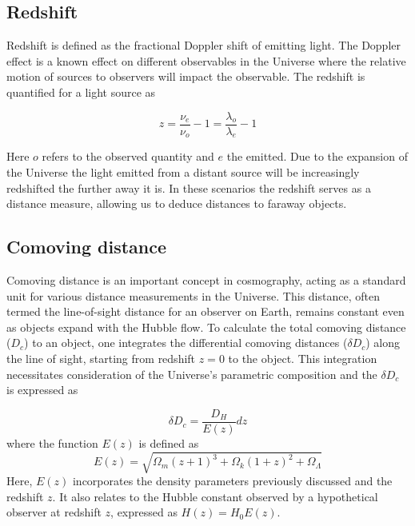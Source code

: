 \documentclass{article}
\begin{document}
\subsection{Redshift}
Redshift is defined as the fractional Doppler shift of emitting light. The Doppler effect is a known effect on different observables in the Universe where the relative motion of sources to observers will impact the observable. The redshift is quantified for a light source as 

\begin{equation}
    z = \frac{\nu_e}{\nu_o}-1 = \frac{\lambda_o}{\lambda_e}-1
\end{equation}

Here $o$ refers to the observed quantity and $e$ the emitted. Due to the expansion of the Universe the light emitted from a distant source will be increasingly redshifted the further away it is.
In these scenarios the redshift serves as a distance measure, allowing us to deduce distances to faraway objects.



\subsection{Comoving distance}
\label{sec:comoving_distance}


Comoving distance is an important concept in cosmography, 
acting as a standard unit for various distance measurements in the Universe. 
This distance, often termed the line-of-sight distance for an observer on Earth, 
remains constant even as objects expand with the Hubble flow. 
To calculate the total comoving distance ($D_c$) to an object, 
one integrates the differential comoving distances ($\delta D_c$) along the line of sight, starting from redshift 
$z=0$ to the object. This integration necessitates consideration of the Universe's parametric composition and the $\delta D_c$ is expressed as

\begin{equation}
    \delta D_c = \frac{D_H}{E(z)}dz
\end{equation}
where the function $E(z)$ is defined as
\begin{equation}
    E(z)  = \sqrt{\Omega_m(z+1)^3 +\Omega_k (1+z)^2 + \Omega_\Lambda  }
\end{equation}
Here, 
$E(z)$ incorporates the density parameters previously discussed and the redshift 
$z$. It also relates to the Hubble constant observed by a hypothetical observer at redshift $z$, expressed as 
$H(z) = H_0 E(z)$.
\end{document}
